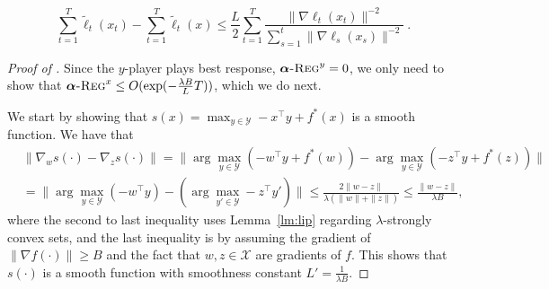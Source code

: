 \documentclass[final,12pt]{colt2018} %
\def\argmin{\mathop{\arg\min}}
\def\balpha{\boldsymbol{\alpha}}
\newcommand{\regret}[1]{\balpha\textsc{-Reg}^{#1}}
\newcommand{\XX}{\mathcal{X}}
\newcommand{\YY}{\mathcal{Y}}
\begin{document}
\begin{equation} \label{eq:RegretStronglycVX}
\sum_{t=1}^T \tilde{\ell}_t(x_t)-\sum_{t=1}^T \tilde{\ell}_t(x) 
\le 
\frac{L}{2} \sum_{t=1}^T \frac{\| \nabla \ell_t(x_t) \|^{-2}}{\sum_{s=1}^t \| \nabla \ell_s(x_s) \|^{-2}}~.
\end{equation}


\begin{proof}[Proof of ]
Since the $y$-player plays best response, $\regret{y}=0$, we only need to show that
$\regret{x} \leq O(\exp(-\frac{\lambda B}{L} T))$, which we do next.



We start by showing that $s(x) = \max_{y \in \YY} - x^\top y + f^*(x)$ is a smooth function.
We have that 
\begin{equation}
\begin{aligned}
& \| \nabla_w s(\cdot) - \nabla_z s(\cdot) \| = 
\| \arg\max_{y \in \YY} ( - w^\top y + f^*(w) ) -  \arg\max_{y \in \YY} ( - z^\top y + f^*(z) ) \|
\\ &= \| \arg\max_{y \in \YY} ( - w^\top y) - (\arg\max_{y' \in \YY}  - z^\top y') \|
\leq  \frac{ 2 \| w - z \|}{ \lambda ( \| w\| + \| z\| ) }
\leq  \frac{ \| w - z \|}{ \lambda B},
\end{aligned}
\end{equation}
where the second to last inequality uses Lemma~\ref{lm:lip} regarding $\lambda$-strongly convex sets,
and the last inequality is by assuming the gradient of $\| \nabla f(\cdot)\| \geq B$
and the fact that $w,z \in \XX$ are gradients of $f$.
This shows that $s(\cdot)$ is a smooth function with smoothness constant $L'=\frac{1}{\lambda B}$.


\begin{comment}
Also note that the global minimum of $s(\cdot)$ lies in $\XX$. In order to see this let us denote by
$y^* = \argmin_{y\in \YY}f(y)$. Then clearly,
\begin{align}
\min_{x\in\XX}s(x) = \min_{x\in\XX}\max_{y\in \YY}\{- x^\top y + f^*(x)\}  = \min_{x\in\XX}\{- x^\top y^* + f^*(x)\} 
=\nabla f(y^*) \in\XX
\end{align}


Note that since we assume that the optimum point of the underlying function $f$ is in the interior of the constraint set, the gradient is always bounded below by a positive constant before reaching the optimum point.
So, we are fine here.
\jk{Can everyone check the above argument make sense?} \kal{this seems like a big problem if the minimum of $-x^T y + f^*(x)$ is contained in $\YY$. But why does this condition need to hold?}


\end{comment}
\end{proof}
\end{document}
